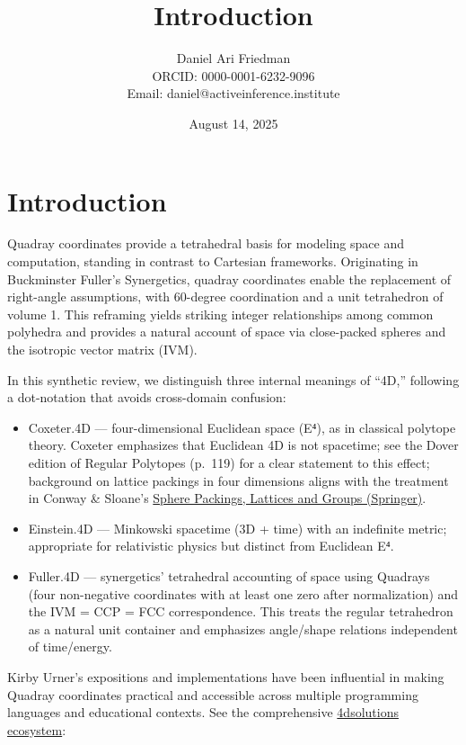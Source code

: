 \documentclass[
  10pt,
]{article}
\title{Introduction}
\author{Daniel Ari Friedman\\ ORCID: 0000-0001-6232-9096\\ Email: daniel@activeinference.institute}
\date{August 14, 2025}
\providecommand{\tightlist}{%
  \setlength{\itemsep}{0pt}\setlength{\parskip}{0pt}}
\begin{document}
\maketitle

{
\hypersetup{linkcolor=red}
\setcounter{tocdepth}{3}
\tableofcontents
}
\hypertarget{introduction}{%
\section{Introduction}\label{introduction}}

Quadray coordinates provide a tetrahedral basis for modeling space and
computation, standing in contrast to Cartesian frameworks. Originating
in Buckminster Fuller's Synergetics, quadray coordinates enable the
replacement of right-angle assumptions, with 60-degree coordination and
a unit tetrahedron of volume 1. This reframing yields striking integer
relationships among common polyhedra and provides a natural account of
space via close-packed spheres and the isotropic vector matrix (IVM).

In this synthetic review, we distinguish three internal meanings of
``4D,'' following a dot-notation that avoids cross-domain confusion:

\begin{itemize}
\tightlist
\item
  Coxeter.4D --- four-dimensional Euclidean space (E⁴), as in classical
  polytope theory. Coxeter emphasizes that Euclidean 4D is not
  spacetime; see the Dover edition of Regular Polytopes (p.~119) for a
  clear statement to this effect; background on lattice packings in four
  dimensions aligns with the treatment in Conway \& Sloane's
  \href{https://link.springer.com/book/10.1007/978-1-4757-6568-7}{Sphere
  Packings, Lattices and Groups (Springer)}.
\item
  Einstein.4D --- Minkowski spacetime (3D + time) with an indefinite
  metric; appropriate for relativistic physics but distinct from
  Euclidean E⁴.
\item
  Fuller.4D --- synergetics' tetrahedral accounting of space using
  Quadrays (four non-negative coordinates with at least one zero after
  normalization) and the IVM = CCP = FCC correspondence. This treats the
  regular tetrahedron as a natural unit container and emphasizes
  angle/shape relations independent of time/energy.
\end{itemize}

Kirby Urner's expositions and implementations have been influential in
making Quadray coordinates practical and accessible across multiple
programming languages and educational contexts. See the comprehensive
\href{https://github.com/4dsolutions}{4dsolutions ecosystem}:
\end{document}
